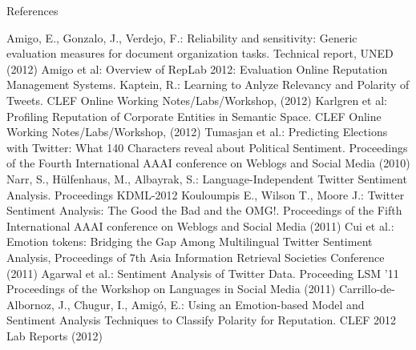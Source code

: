 \documentclass[12pt,a4paper]{beamer}
\begin{document}
\begin{frame}[allowframebreaks]{References}
\begin{thebibliography}{-}
 Amigo, E., Gonzalo, J., Verdejo, F.: Reliability and sensitivity: Generic evaluation measures for document organization tasks. Technical report, UNED (2012)
 Amigo et al: Overview of RepLab 2012: Evaluation Online Reputation Management Systems. 
 Kaptein, R.: Learning to Anlyze Relevancy and Polarity of Tweets. CLEF Online Working Notes/Labs/Workshop, (2012)
 Karlgren et al: Profiling Reputation of Corporate Entities in Semantic Space. CLEF Online Working Notes/Labs/Workshop, (2012)
 Tumasjan et al.: Predicting Elections with Twitter: What 140 Characters reveal about Political Sentiment. Proceedings of the Fourth International AAAI conference on Weblogs and Social Media (2010)
 Narr, S., Hülfenhaus, M., Albayrak, S.: Language-Independent Twitter Sentiment Analysis. Proceedings KDML-2012
 Kouloumpis E., Wilson T., Moore J.: Twitter Sentiment Analysis: The Good the Bad and the OMG!.  Proceedings of the Fifth International AAAI conference on Weblogs and Social Media (2011)
 Cui et al.: Emotion tokens: Bridging the Gap Among Multilingual Twitter Sentiment Analysis, Proceedings of 7th Asia Information Retrieval Societies Conference (2011)
 Agarwal et al.: Sentiment Analysis of Twitter Data. Proceeding LSM '11 Proceedings of the Workshop on Languages in Social Media (2011)
 Carrillo-de-Albornoz, J., Chugur, I., Amigó, E.: Using an Emotion-based Model and Sentiment Analysis Techniques to Classify Polarity for Reputation. CLEF 2012 Lab Reports (2012)
\end{thebibliography}
\end{frame}
\end{document}
